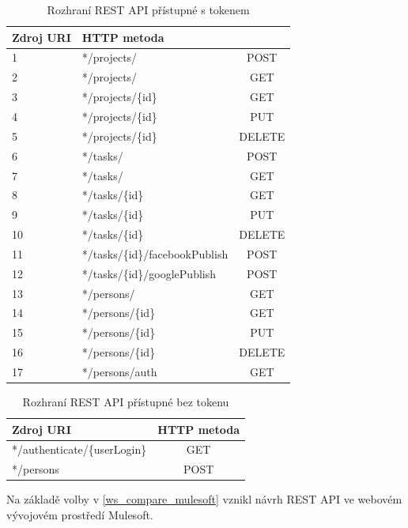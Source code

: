 \documentclass[thesis=B,czech]{FITthesis}[2012/06/26]
\begin{document}
\begin{table}\centering
\caption{Rozhraní REST API přístupné s tokenem}\label{tab:RESTfulAPI_rozhrani_s}
	\begin{tabular}[t]{l l c}
		\toprule
		\textbf{Zdroj URI} & \textbf{HTTP metoda}\\ \midrule \midrule
		1&*/projects/ & POST \\ \midrule
		2&*/projects/ & GET \\ \midrule
		3&*/projects/\{id\} & GET \\ \midrule
		4&*/projects/\{id\} & PUT \\ \midrule
		5&*/projects/\{id\} & DELETE \\ \midrule  
		6&*/tasks/ & POST \\ \midrule
		7&*/tasks/ & GET \\ \midrule
		8&*/tasks/\{id\} & GET \\ \midrule
		9&*/tasks/\{id\} & PUT \\ \midrule
		10&*/tasks/\{id\} & DELETE \\ \midrule       
		11&*/tasks/\{id\}/facebookPublish & POST \\ \midrule
		12&*/tasks/\{id\}/googlePublish & POST \\ \midrule
		13&*/persons/ & GET \\ \midrule
		14&*/persons/\{id\} & GET \\ \midrule
		15&*/persons/\{id\} & PUT \\ \midrule
		16&*/persons/\{id\} & DELETE \\ \midrule  	
		17&*/persons/auth & GET \\ \midrule  				
	\end{tabular}
\end{table}

\begin{table}\centering
	\caption{Rozhraní REST API přístupné bez tokenu}\label{tab:RESTfulAPI_rozhrani_bez}
	\begin{tabular}{l c}
		\toprule
		\textbf{Zdroj URI} & \textbf{HTTP metoda}\\ \midrule \midrule
		*/authenticate/\{userLogin\} & GET \\ \midrule
		*/persons & POST \\ \midrule
	\end{tabular}
\end{table}


Na základě volby v \ref{ws_compare_mulesoft} vznikl návrh REST API ve webovém vývojovém prostředí Mulesoft.\newline 
\end{document}
